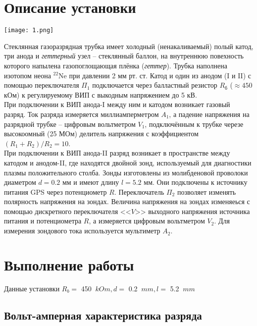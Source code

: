 \documentclass[a4paper,12pt]{article}
\begin{document}
\section*{Описание установки}
\begin{center}
\texttt{[image: 1.png]}
\end{center}
Стеклянная газоразрядная трубка имеет холодный (ненакаливаемый) полый катод, три анода и \textit{геттерный} узел -- стеклянный баллон, на внутреннюю повехность которого напылена газопоглощающая плёнка (\textit{геттер}). Трубка наполнена изотопом неона $^22$Ne при давлении 2 мм рт. ст. Катод и один из анодом (I и II) с помощью переключателя $\Pi_1$ подключается через балластный резистор $R_\text{б}$ ($\approx 450$ кОм) к регулируемому ВИП с выкодным напряжением до 5 кВ.\\
При подключении к ВИП анода-I между ним и катодом возникает газовый разряд. Ток разряда измеряется миллиамперметром $A_1$, а падение напряжения на разрядной трубке -- цифровым вольтметром $V_1$, подключённым к трубке черезе высокоомный (25 МОм) делитель напряжения с коэффициентом $(R_1+R_2)/R_2 = 10$.\\
При подключении к ВИП анода-II разряд возникает в пространстве между катодом и анодом-II, где находятся двойной зонд, используемый для диагностики плазмы положительного столба. Зонды изготовлены из молибденовой проволоки диаметром $d = 0.2$ мм и имеют длину $l = 5.2$ мм. Они подключены к источнику питания GPS через потенциометр $R$. Переключатель $\Pi_2$ позволяет изменять полярность напряжения на зондах. Величина напряжения на зондах изменяеься с помощью дискретного переключателя <<$V$>> выходного напряжения источника питания и потенциометра $R$, а измеряется цифровым вольтметром $V_2$. Для измерения зондового тока используется мультиметр $A_2$.





\section{Выполнение работы}

Данные установки $R_b = $ 450 $\: kOm, d = $ 0.2 $\: mm, l =$  5.2 $\: mm$

 \subsection{Вольт-амперная характеристика разряда}
\end{document}
